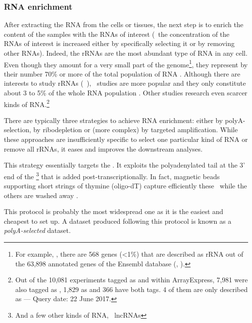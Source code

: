 \subsubsection{\gls{RNA} enrichment}

After extracting the \gls{RNA} from the cells or tissues,
the next step is to enrich the content of the samples with the \glspl{RNA}
of interest (\ie\ the concentration of the \glspl{RNA} of interest is increased
either by specifically selecting it or by removing other \glspl{RNA}). Indeed,
the \glspl{rRNA} are the most abundant type of \gls{RNA} in any cell. Even
though they amount for a very small part of the genome\footnote{For example,
, there are 568 genes (<1\%) that are described as
\gls{rRNA} out of the 63,898 annotated genes of the \gls{Ensembl} database
(, ).}, they represent by their number 70\% or more of
the total population of \gls{RNA} .
Although there are interests to study \glspl{rRNA} (\eg\ ),
\mRNAs\ studies are more
popular and they only constitute about 3 to 5\% of the whole \gls{RNA} population
. Other studies research even scarcer kinds of
\gls{RNA}.\footnote{Out of the 10,081 experiments tagged as  and  within \gls{ArrayExpress},
7,981 were also tagged as ,
1,829 as  and 366 have both tags.
4 of them are only described as  --- Query date: 22 June 2017.}

There are typically three strategies to achieve \gls{RNA} enrichment:
either by polyA-selection, by ribodepletion or (more complex)
by targeted amplification. While these
approaches are insufficiently specific to select one particular kind of \gls{RNA}
or remove all \glspl{rRNA}, it eases and improves the downstream analyses.

This strategy essentially targets the \mRNAs. It exploits the polyadenylated
tail at the 3' end of the \mRNAs\footnote{And a few other kinds of \gls{RNA},
\eg\ \glspl{lncRNA} } that is added
post-transcriptionally. In fact, magnetic beads supporting short
strings of thymine (oligo-dT) capture efficiently these \mRNAs\ while the others
are washed away .

This protocol is probably the most widespread one as it is the easiest and
cheapest to set up. A dataset produced following this protocol is known as
a \emph{polyA-selected} dataset.

